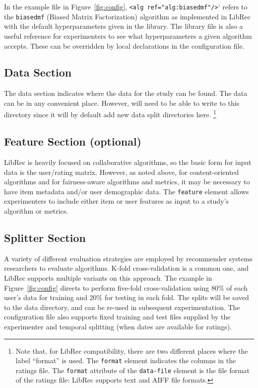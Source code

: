 In the example file in Figure~\ref{fig:config}, \texttt{<alg ref="alg:biasedmf"/>}` refers to the \texttt{biasedmf} (Biased Matrix Factorization) algorithm as implemented in LibRec with the default hyperparameters given in the library. The library file is also a useful reference for experimenters to see what hyperparameters a given algorithm accepts. These can be overridden by local declarations in the configuration file.

\subsection{Data Section}
\label{subsec:libauto_data_sec}

The data section indicates where the data for the study can be found. The data can be in any convenient place. However, \libauto{} will need to be able to write to this directory since it will by default add new data split directories here. \footnote{Note that, for LibRec compatibility, there are two different places where the label ``format'' is used. The \texttt{format} element indicates the columns in the ratings file. The \texttt{format} attribute of the \texttt{data-file} element is the file format of the ratings file: LibRec supports text and AIFF file formats.}

\subsection{Feature Section (optional)}
\label{subsec:libauto_feature_selection}

LibRec is heavily focused on collaborative algorithms, so the basic form for input data is the user/rating matrix. However, as noted above, for content-oriented algorithms and for fairness-aware algorithms and metrics, it may be necessary to have item metadata and/or user demographic data. The \texttt{feature} element allows experimenters to include either item or user features as input to a study's algorithm or metrics. 

\subsection{Splitter Section}
\label{subsec:libauto_splitter}

A variety of different evaluation strategies are employed by recommender systems researchers to evaluate algorithms. K-fold cross-validation is a common one, and LibRec supports multiple variants on this approach. The example in Figure~\ref{fig:config} directs \libauto{} to perform five-fold cross-validation using 80\% of each user's data for training and 20\% for testing in each fold. The splits will be saved to the data directory, and can be re-used in subsequent experimentation. The configuration file also supports fixed training and test files supplied by the experimenter and temporal splitting (when dates are available for ratings). 

